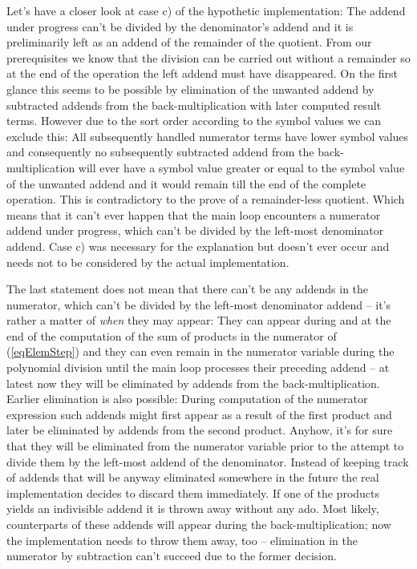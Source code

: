 Let's have a closer look at case c) of the hypothetic implementation: The
addend under progress can't be divided by the denominator's addend and it
is preliminarily left as an addend of the remainder of the quotient. From
our prerequisites we know that the division can be carried out without a
remainder so at the end of the operation the left addend must have
disappeared. On the first glance this seems to be possible by elimination
of the unwanted addend by subtracted addends from the back-multiplication
with later computed result terms. However due to the sort order according
to the symbol values we can exclude this: All subsequently handled numerator
terms have lower symbol values and consequently no subsequently subtracted
addend from the back-multiplication will ever have a symbol value greater
or equal to the symbol value of the unwanted addend and it would remain till
the end of the complete operation. This is contradictory to the prove of a
remainder-less quotient. Which means that it can't ever happen that the
main loop encounters a numerator addend under progress, which can't be
divided by the left-most denominator addend. Case c) was necessary for the
explanation but doesn't ever occur and needs not to be considered by the
actual implementation.

The last statement does not mean that there can't be any addends in the
numerator, which can't be divided by the left-most denominator addend --
it's rather a matter of \emph{when} they may appear: They can appear
during and at the end of the computation of the sum of products in the
numerator of (\ref{eqElemStep}) and they can even remain in the numerator
variable during the polynomial division until the main loop processes
their preceding addend -- at latest now they will be eliminated by addends
from the back-multiplication. Earlier elimination is also possible: During
computation of the numerator expression such addends might first appear as
a result of the first product and later be eliminated by addends from the
second product. Anyhow, it's for sure that they will be eliminated from
the numerator variable prior to the attempt to divide them by the
left-most addend of the denominator. Instead of keeping track of addends
that will be anyway eliminated somewhere in the future the real
implementation decides to discard them immediately. If one of the products
yields an indivisible addend it is thrown away without any ado. Most
likely, counterparts of these addends will appear during the
back-multiplication; now the implementation needs to throw them away, too
-- elimination in the numerator by subtraction can't succeed due to the
former decision.

